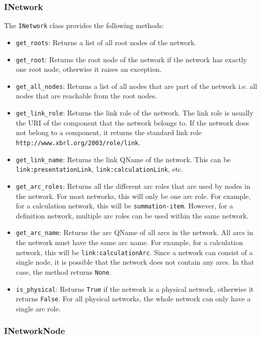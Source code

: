 \subsubsection{INetwork}

The \texttt{INetwork} class provides the following methods:

\begin{itemize}
    \item \texttt{get\_roots}: Returns a list of all root nodes of the network.
    \item \texttt{get\_root}: Returns the root node of the network if the network has exactly one root node, otherwise it raises an exception.
    \item \texttt{get\_all\_nodes}: Returns a list of all nodes that are part of the network i.e. all nodes that are reachable from the root nodes.
    \item \texttt{get\_link\_role}: Returns the link role of the network. 
    The link role is usually the URI of the component that the network belongs to.
    If the network does not belong to a component, it returns the standard link role \texttt{http://www.xbrl.org/2003/role/link}.
    \item \texttt{get\_link\_name}: Returns the link QName of the network.
    This can be \texttt{link:presentationLink}, \texttt{link:calculationLink}, etc.
    \item \texttt{get\_arc\_roles}: Returns all the different arc roles that are used by nodes in the network.
    For most networks, this will only be one arc role.
    For example, for a calculation network, this will be \texttt{summation-item}.
    However, for a definition network, multiple arc roles can be used within the same network.
    \item \texttt{get\_arc\_name}: Returns the arc QName of all arcs in the network.
    All arcs in the network must have the same arc name.
    For example, for a calculation network, this will be \texttt{link:calculationArc}.
    Since a network can consist of a single node, it is possible that the network does not contain any arcs.
    In that case, the method returns \texttt{None}.
    \item \texttt{is\_physical}: Returns \texttt{True} if the network is a physical network, otherwise it returns \texttt{False}.
    For all physical networks, the whole network can only have a single arc role.
\end{itemize}

\subsubsection{INetworkNode}

